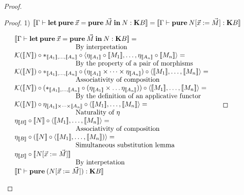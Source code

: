 \documentclass[a4paper]{article}
\begin{document}
\begin{proof}
\begin{proof}
\vspace{\baselineskip}

1) $[\![\Gamma \vdash {\bf let \: pure \:} \vec{x} = {\bf pure \:} \vec{M} {\: \bf in \:} N : {\bf K}B]\!] = [\![\Gamma \vdash {\bf pure \:} N [\vec{x} := \vec{M}] : {\bf K}B]\!]$

\vspace{\baselineskip}

$\begin{array}{lll}
&[\![\Gamma \vdash {\bf let \: pure \:} \vec{x} = {\bf pure \:} \vec{M} {\: \bf in \:} N : {\bf K}B]\!] = & \\
&\text{\quad\quad\quad\quad\quad\quad\quad\quad\quad By interpretation}& \\
&\mathcal{K}([\![N]\!]) \circ \ast_{[\![A_1]\!],\dots,[\![A_n]\!]} \circ \langle \eta_{[\![A_1]\!]} \circ [\![M_1]\!],\dots,\eta_{[\![A_n]\!]} \circ [\![M_n]\!] \rangle = \\
&\text{\quad\quad\quad\quad\quad\quad\quad\quad\quad By the property of a pair of morphisms}& \\
&\mathcal{K}([\![N]\!]) \circ \ast_{[\![A_1]\!],\dots,[\![A_n]\!]} \circ (\eta_{[\![A_1]\!]} \times \dots \times \eta_{[\![A_n]\!]}) \circ \langle [\![M_1]\!], \dots, [\![M_n]\!]\rangle =& \\
&\text{\quad\quad\quad\quad\quad\quad\quad\quad\quad Associativity of composition}& \\
&\mathcal{K}([\![N]\!]) \circ (\ast_{[\![A_1]\!],\dots,[\![A_n]\!]} \circ (\eta_{[\![A_1]\!]} \times \dots \eta_{[\![A_n]\!]})) \circ \langle [\![M_1]\!], \dots, [\![M_n]\!] \rangle =& \\
&\text{\quad\quad\quad\quad\quad\quad\quad\quad\quad By the definition of an applicative functor}& \\
&\mathcal{K}([\![N]\!]) \circ \eta_{[\![A_1]\!] \times \dots \times [\![A_n]\!]} \circ \langle [\![M_1]\!], \dots, [\![M_n]\!] \rangle =& \\
&\text{\quad\quad\quad\quad\quad\quad\quad\quad\quad Naturality of $\eta$}& \\
&\eta_{[\![B]\!]} \circ [\![N]\!] \circ \langle [\![M_1]\!], \dots, [\![M_n]\!] \rangle =& \\
&\text{\quad\quad\quad\quad\quad\quad\quad\quad\quad Associativity of composition}& \\
&\eta_{[\![B]\!]} \circ ([\![N]\!] \circ \langle [\![M_1]\!], \dots, [\![M_n]\!]) \rangle =& \\
&\text{\quad\quad\quad\quad\quad\quad\quad\quad\quad Simultaneous substitution lemma}& \\
&\eta_{[\![B]\!]} \circ [\![N [\vec{x} := \vec{M}]]\!]& \\
&\text{\quad\quad\quad\quad\quad\quad\quad\quad\quad By interpetation}& \\
&[\![\Gamma \vdash {\bf pure \:} (N [\vec{x} := \vec{M}]) : {\bf K}B]\!]&
\end{array}$

\end{proof}

\end{proof}
\end{document}
